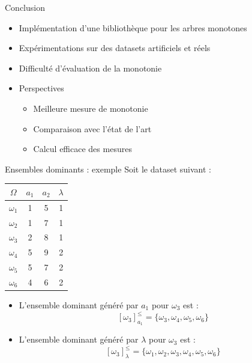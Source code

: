\documentclass[usenames,dvipsnames]{beamer}
\begin{document}
\begin{frame}{Conclusion}
    \begin {itemize}
        \item Implémentation d'une bibliothèque pour les arbres monotones
        \item Expérimentations sur des datasets artificiels et réels
        \item Difficulté d'évaluation de la monotonie
        \item Perspectives
            \begin{itemize}
                \item Meilleure mesure de monotonie
                \item Comparaison avec l'état de l'art
                \item Calcul efficace des mesures
            \end{itemize}
    \end{itemize}
\end{frame}

\begin{frame}[allowframebreaks]
  \printbibliography
\end{frame}

\begin{frame}
  \titlepage
\end{frame}


\begin{frame}{Ensembles dominants : exemple}
Soit le dataset suivant :

\begin{table}
\begin{tabular}{|*{3}{c|} | c |}
    \hline
        $\Omega$ & $a_1$ & $a_2$ & $\lambda$ \\
    \hline 
        $\omega_1$ & 1 & 5 & 1 \\ 
        $\omega_2$ & 1 & 7 & 1 \\
        $\omega_3$ & 2 & 8 & 1\\
        $\omega_4$ & 5 & 9 & 2 \\
        $\omega_5$ & 5 & 7 & 2 \\ 
        $\omega_6$ & 4  & 6 & 2\\
    \hline
\end{tabular}

\begin{itemize}
    \item L'ensemble dominant généré par $a_1$ pour $\omega_3$ est : 
        $$[\omega_3]^{\leq}_{a_1} = \{\omega_3, \omega_4, \omega_5, \omega_6\}$$
    \item L'ensemble dominant généré par $\lambda$ pour $\omega_3$ est :
        $$[\omega_3]^{\leq}_{\lambda} = \{\omega_1, \omega_2, \omega_3, \omega_4, \omega_5, \omega_6\}$$
\end{itemize}
\label{tab:dsa-dataset}
\end{table}
\end{frame}
\end{document}
